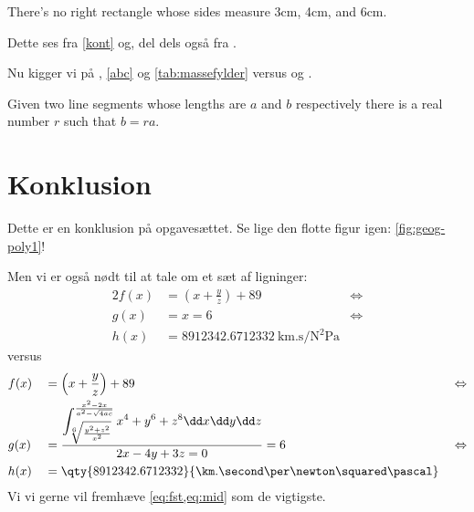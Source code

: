 \documentclass[a4paper, 12pt]{article}
\begin{document}
\begin{korollar}
There's no right rectangle whose sides measure 3cm, 4cm, and 6cm.
\end{korollar}

Dette ses fra \cref{kont} og, del dels også fra .

Nu kigger vi på , \cref{abc} og \cref{tab:massefylder} versus  og .

\begin{lemma}
Given two line segments whose lengths are \(a\) and \(b\) respectively there is a 
real number \(r\) such that \(b=ra\).
\end{lemma}

\section*{Konklusion}
Dette er en konklusion på opgavesættet. Se lige den flotte figur igen: \cref{fig:geog-poly1}!

Men vi er også nødt til at tale om et sæt af ligninger:
\begin{alignat*}{2}
    f(x) &= \left(x+\frac{y}{z}\right)+89 &\Leftrightarrow \\
    g(x) &= x=6                           &\Leftrightarrow \\
    h(x) &= \qty{8912342.6712332}{\km.\second\per\newton\squared\pascal}
\end{alignat*}
versus
\begin{alignat}{3}
    & f(x) && = \left(x+\frac{y}{z}\right)+89 && \Leftrightarrow\label{eq:fst} \\
    & g(x) && = \frac{\displaystyle\int^\frac{x^2-2x}{a^2-\sqrt{4ac}}_{\sqrt[6]{\frac{y^2+z^2}{x^2}}}x^4+y^6+z^8\dd x\dd y\dd z}{2x-4y+3z=0}=6  && \Leftrightarrow\label{eq:mid} \\
    & h(x) && = \qty{8912342.6712332}{\km.\second\per\newton\squared\pascal}\notag
\end{alignat}
Vi vi gerne vil fremhæve \cref{eq:fst,eq:mid} som de vigtigste.
\label{LastPage} %
\end{document}
